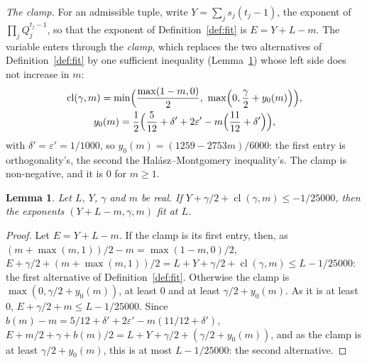 \documentclass[11pt]{article}
\newtheorem{lemma}[theorem]{Lemma}
\theoremstyle{definition}
\begin{document}
\emph{The clamp.} For an admissible tuple, write $Y = \sum_j s_j(t_j - 1)$, the exponent of $\prod_j Q_j^{t_j - 1}$, so
that the exponent of Definition~\ref{def:fit} is $E = Y + L - m$. The variable enters through the \emph{clamp}, which
replaces the two alternatives of Definition~\ref{def:fit} by one sufficient inequality (Lemma~\ref{lem:clamp}) whose
left side does not increase in $m$:
\begin{gather*}
  \operatorname{cl}(\gamma, m) = \min\Bigl(\frac{\max(1 - m, 0)}2,\ \max\Bigl(0, \frac\gamma2 + y_0(m)\Bigr)\Bigr), \\
  y_0(m) = \frac12\Bigl(\frac5{12} + \delta' + 2\varepsilon' - m\Bigl(\frac{11}{12} + \delta'\Bigr)\Bigr),
\end{gather*}
with $\delta' = \varepsilon' = 1/1000$, so $y_0(m) = (1259 - 2753m)/6000$: the first entry is orthogonality's, the
second the Hal\'asz--Montgomery inequality's. The clamp is non-negative, and it is $0$ for $m \ge 1$.

\begin{lemma}\label{lem:clamp}
Let $L$, $Y$, $\gamma$ and $m$ be real. If $Y + \gamma/2 + \operatorname{cl}(\gamma, m) \le -1/25000$, then
the exponents $(Y + L - m, \gamma, m)$ fit at $L$.
\end{lemma}

\begin{proof}
Let $E = Y + L - m$. If the clamp is its first entry, then, as $(m + \max(m, 1))/2 - m = \max(1 - m, 0)/2$,
$E + \gamma/2 + (m + \max(m, 1))/2 = L + Y + \gamma/2 + \operatorname{cl}(\gamma, m) \le L - 1/25000$: the first
alternative of Definition~\ref{def:fit}. Otherwise the clamp is $\max(0, \gamma/2 + y_0(m))$, at least $0$ and at least
$\gamma/2 + y_0(m)$. As it is at least $0$, $E + \gamma/2 + m \le L - 1/25000$. Since $b(m) - m = 5/12 + \delta' +
2\varepsilon' - m(11/12 + \delta')$, $E + m/2 + \gamma + b(m)/2 = L + Y + \gamma/2 + (\gamma/2 + y_0(m))$, and as the
clamp is at least $\gamma/2 + y_0(m)$, this is at most $L - 1/25000$: the second alternative.
\end{proof}
\end{document}

